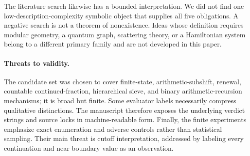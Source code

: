 The literature search likewise has a bounded interpretation.  We did not find
one low-description-complexity symbolic object that supplies all five
obligations.  A negative search is not a theorem of nonexistence.  Ideas whose
definition requires modular geometry, a quantum graph, scattering theory, or
a Hamiltonian system belong to a different primary family and are not
developed in this paper.

\paragraph{Threats to validity.}
The candidate set was chosen to cover finite-state, arithmetic-subshift,
renewal, countable continued-fraction, hierarchical sieve, and binary
arithmetic-recursion mechanisms; it is broad but finite.  Some evaluator
labels necessarily compress qualitative distinctions.  The manuscript
therefore exposes the underlying verdict strings and source locks in
machine-readable form.  Finally, the finite experiments emphasize exact
enumeration and adverse controls rather than statistical sampling.  Their
main threat is cutoff interpretation, addressed by labeling every
continuation and near-boundary value as an observation.
